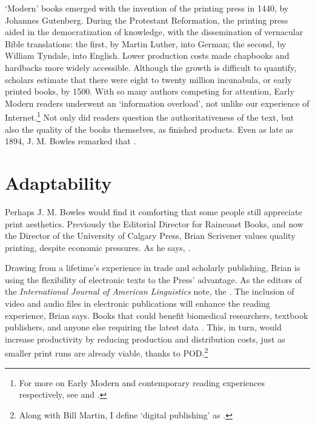 \documentclass[12pt,a4paper]{scrartcl}
\begin{document}
`Modern' books emerged with the invention of the printing press in 1440, by Johannes Gutenberg. During the Protestant Reformation, the printing press aided in the democratization of knowledge, with the dissemination of vernacular Bible translations: the first, by Martin Luther, into German; the second, by William Tyndale, into English. Lower production costs made chapbooks and hardbacks more widely accessible. Although the growth is difficult to quantify, scholars estimate that there were eight to twenty million incunabula, or early printed books, by 1500. With so many authors competing for attention, Early Modern readers underwent an `information overload', not unlike our experience of Internet.\footnote{For more on Early Modern and contemporary reading experiences respectively, see \citeauthor{blair} and \citeauthor{jacobs}.} Not only did readers question the authoritativeness of the text, but also the quality of the books themselves, as finished products. Even as late as 1894, J. M. Bowles remarked that \parencite{bowles}.

\section{Adaptability}

Perhaps J. M. Bowles would find it comforting that some people still appreciate print aesthetics. Previously the Editorial Director for Raincoast Books, and now the Director of the University of Calgary Press, Brian Scrivener values quality printing, despite economic pressures. As he says,  \parencite{scrivener}.\par 

Drawing from a lifetime's experience in trade and scholarly publishing, Brian is using the flexibility of electronic texts to the Press' advantage. As the editors of the \textit{International Journal of American Linguistics} note, the  \parencite[2]{beck}. The inclusion of video and audio files in electronic publications will enhance the reading experience, Brian says. Books that  could benefit biomedical researchers, textbook publishers, and anyone else requiring the latest data \parencite{scrivener}. This, in turn, would increase productivity by reducing production and distribution costs, just as smaller print runs are already viable, thanks to POD.\footnote{Along with Bill Martin, I define `digital publishing' as \cite[39]{martin}.}
\end{document}
